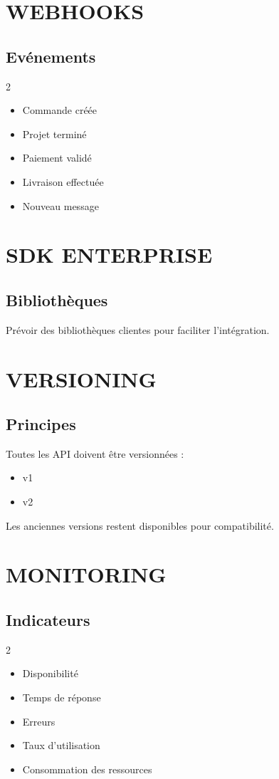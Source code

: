 \documentclass[12pt,a4paper,oneside]{book}
\begin{document}
\chapter{WEBHOOKS}

\section{Evénements}
\begin{multicols}{2}
\begin{itemize}
\item Commande créée
\item Projet terminé
\item Paiement validé
\item Livraison effectuée
\item Nouveau message
\end{itemize}
\end{multicols}

\chapter{SDK ENTERPRISE}

\section{Bibliothèques}
Prévoir des bibliothèques clientes pour faciliter l'intégration.

\chapter{VERSIONING}

\section{Principes}
Toutes les API doivent être versionnées :
\begin{itemize}
\item v1
\item v2
\end{itemize}
Les anciennes versions restent disponibles pour compatibilité.

\chapter{MONITORING}

\section{Indicateurs}
\begin{multicols}{2}
\begin{itemize}
\item Disponibilité
\item Temps de réponse
\item Erreurs
\item Taux d'utilisation
\item Consommation des ressources
\end{itemize}
\end{multicols}
\end{document}
